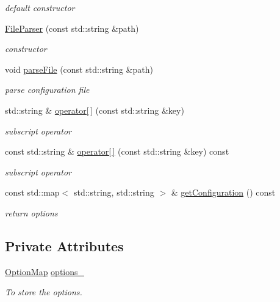 \begin{DoxyCompactItemize}
\begin{DoxyCompactList}\small\item\em default constructor \item\end{DoxyCompactList}\item 
\hyperlink{classFileParser_a85356618e2fba46589474ed5194d0825}{FileParser} (const std::string \&path)
\begin{DoxyCompactList}\small\item\em constructor \item\end{DoxyCompactList}\item 
void \hyperlink{classFileParser_a3ebc2941ae83425b261108a7322b3e3c}{parseFile} (const std::string \&path)
\begin{DoxyCompactList}\small\item\em parse configuration file \item\end{DoxyCompactList}\item 
std::string \& \hyperlink{classFileParser_aec9f5cb1d3f8d520a9a08e1a6c758647}{operator\mbox{[}$\,$\mbox{]}} (const std::string \&key)
\begin{DoxyCompactList}\small\item\em subscript operator \item\end{DoxyCompactList}\item 
const std::string \& \hyperlink{classFileParser_a9ea2f5076226715fc4885afa91f596b1}{operator\mbox{[}$\,$\mbox{]}} (const std::string \&key) const 
\begin{DoxyCompactList}\small\item\em subscript operator \item\end{DoxyCompactList}\item 
const std::map$<$ std::string, std::string $>$ \& \hyperlink{classFileParser_aae45d3086ccf13cc362fc1672a3f9d06}{getConfiguration} () const 
\begin{DoxyCompactList}\small\item\em return options \item\end{DoxyCompactList}\end{DoxyCompactItemize}
\subsection*{Private Attributes}
\begin{DoxyCompactItemize}
\item 
\hypertarget{classFileParser_a0b906d2edd851f1f39dccf425b26f6df}{
\hyperlink{CommonParser_8hpp_ab9159c3df8bcd3d187740f9b123463d6}{OptionMap} \hyperlink{classFileParser_a0b906d2edd851f1f39dccf425b26f6df}{options\_\-}}
\label{classFileParser_a0b906d2edd851f1f39dccf425b26f6df}

\begin{DoxyCompactList}\small\item\em To store the options. \item\end{DoxyCompactList}\end{DoxyCompactItemize}


